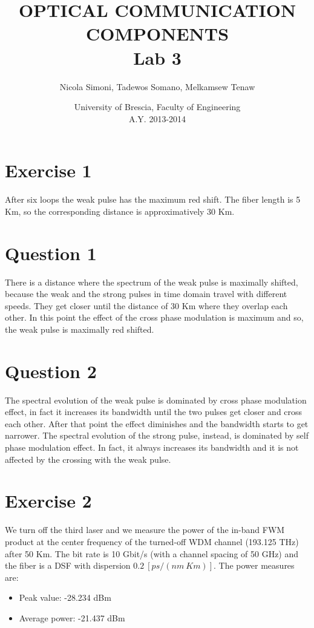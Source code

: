 \documentclass[a4paper,10pt]{report}
\title{\textbf{OPTICAL COMMUNICATION COMPONENTS \\ Lab 3}}
\author{Nicola Simoni, Tadewos Somano, Melkamsew Tenaw}
\date{University of Brescia, Faculty of Engineering\\A.Y. 2013-2014}
\begin{document}
\maketitle

\section*{Exercise 1}
After six loops the weak pulse has the maximum red shift. The fiber length is 5 Km, so the corresponding distance is
approximatively 30 Km.

\section*{Question 1}
There is a distance where the spectrum of the weak pulse is maximally shifted, because the weak and the strong pulses
in time domain travel with different speeds.
They get closer until the distance of 30 Km where they overlap each other.
In this point the effect of the cross phase modulation is maximum and so, the weak pulse is maximally red shifted.

\section*{Question 2}
The spectral evolution of the weak pulse is dominated by cross phase modulation effect, in fact it increases its bandwidth until the two pulses
get closer and cross each other. After that point the effect diminishes and the bandwidth starts to get narrower.
The spectral evolution of the strong pulse, instead, is dominated by self phase modulation effect. In fact, it always increases
its bandwidth and it is not affected by the crossing with the weak pulse.

\section*{Exercise 2}
We turn off the third laser and we measure the power of the in-band FWM product at the center frequency of the turned-off WDM channel
(193.125 THz) after 50 Km. The bit rate is 10 Gbit/s (with a channel spacing of 50 GHz) and the fiber is a DSF with dispersion $0.2 \ [ps/(nm \ Km)]$.
The power measures are:

\begin{itemize}
 \item Peak value: -28.234 dBm		%
 \item Average power: -21.437 dBm	%
\end{itemize}
\end{document}
